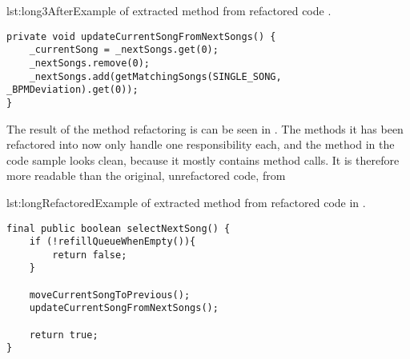 
\begin{code}{lst:long3After}{Example of extracted method from refactored code .}
\begin{lstlisting}
private void updateCurrentSongFromNextSongs() {
    _currentSong = _nextSongs.get(0);
    _nextSongs.remove(0);
    _nextSongs.add(getMatchingSongs(SINGLE_SONG, _BPMDeviation).get(0));
}
\end{lstlisting}
\end{code}


The result of the method refactoring is can be seen in . The methods it has been refactored into now only handle one responsibility each, and the method in the code sample looks clean, because it mostly contains method calls. It is therefore more readable than the original, unrefactored code, from 

\begin{code}{lst:longRefactored}{Example of extracted method from refactored code in .}
\begin{lstlisting}
final public boolean selectNextSong() {
    if (!refillQueueWhenEmpty()){
        return false;
    }

    moveCurrentSongToPrevious();
    updateCurrentSongFromNextSongs();

    return true;
}
\end{lstlisting}
\end{code}
